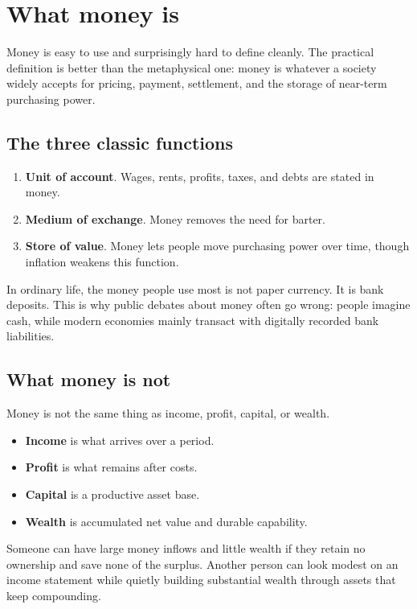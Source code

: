\documentclass[11pt,openany]{book}
\begin{document}
\chapter{What money is}

Money is easy to use and surprisingly hard to define cleanly. The practical definition is better than the metaphysical one: money is whatever a society widely accepts for pricing, payment, settlement, and the storage of near-term purchasing power.

\section{The three classic functions}

\begin{enumerate}
  \item \textbf{Unit of account}. Wages, rents, profits, taxes, and debts are stated in money.
  \item \textbf{Medium of exchange}. Money removes the need for barter.
  \item \textbf{Store of value}. Money lets people move purchasing power over time, though inflation weakens this function.
\end{enumerate}

In ordinary life, the money people use most is not paper currency. It is bank deposits. This is why public debates about money often go wrong: people imagine cash, while modern economies mainly transact with digitally recorded bank liabilities.

\section{What money is not}

Money is not the same thing as income, profit, capital, or wealth.

\begin{itemize}
  \item \textbf{Income} is what arrives over a period.
  \item \textbf{Profit} is what remains after costs.
  \item \textbf{Capital} is a productive asset base.
  \item \textbf{Wealth} is accumulated net value and durable capability.
\end{itemize}

Someone can have large money inflows and little wealth if they retain no ownership and save none of the surplus. Another person can look modest on an income statement while quietly building substantial wealth through assets that keep compounding.
\end{document}
